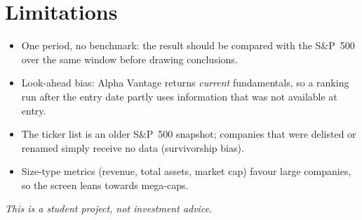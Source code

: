 \documentclass[11pt,a4paper]{article}
\begin{document}
\section{Limitations}
\begin{itemize}\itemsep0pt
  \item One period, no benchmark: the result should be compared with the
        S\&P~500 over the same window before drawing conclusions.
  \item Look-ahead bias: Alpha Vantage returns \emph{current} fundamentals, so
        a ranking run after the entry date partly uses information that was
        not available at entry.
  \item The ticker list is an older S\&P~500 snapshot; companies that were
        delisted or renamed simply receive no data (survivorship bias).
  \item Size-type metrics (revenue, total assets, market cap) favour large
        companies, so the screen leans towards mega-caps.
\end{itemize}

\noindent\emph{This is a student project, not investment advice.}
\end{document}
